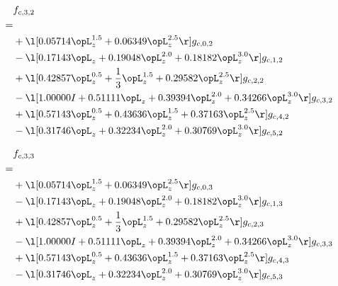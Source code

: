 \begin{alignat}{2} 
\label{eq:f_32_0} 
& f_{c,3,2} \nonumber \\ 
 = \\ 
& + \l[  0.05714 \opL_z^{1.5} +  0.06349 \opL_z^{2.5}  \r] g_{c,0,2} \nonumber \\ 
& - \l[  0.17143 \opL_z +  0.19048 \opL_z^{2.0} +  0.18182 \opL_z^{3.0}  \r] g_{c,1,2} \nonumber \\ 
& + \l[  0.42857 \opL_z^{0.5} + \frac{1}{3} \opL_z^{1.5} +  0.29582 \opL_z^{2.5}  \r] g_{c,2,2} \nonumber \\ 
& - \l[  1.00000 I +  0.51111 \opL_z +  0.39394 \opL_z^{2.0} +  0.34266 \opL_z^{3.0}  \r] g_{c,3,2} \nonumber \\ 
& + \l[  0.57143 \opL_z^{0.5} +  0.43636 \opL_z^{1.5} +  0.37163 \opL_z^{2.5}  \r] g_{c,4,2} \nonumber \\ 
& - \l[  0.31746 \opL_z +  0.32234 \opL_z^{2.0} +  0.30769 \opL_z^{3.0}  \r] g_{c,5,2} \nonumber \\ 
\end{alignat} 


\begin{alignat}{2} 
\label{eq:f_33_0} 
& f_{c,3,3} \nonumber \\ 
 = \\ 
& + \l[  0.05714 \opL_z^{1.5} +  0.06349 \opL_z^{2.5}  \r] g_{c,0,3} \nonumber \\ 
& - \l[  0.17143 \opL_z +  0.19048 \opL_z^{2.0} +  0.18182 \opL_z^{3.0}  \r] g_{c,1,3} \nonumber \\ 
& + \l[  0.42857 \opL_z^{0.5} + \frac{1}{3} \opL_z^{1.5} +  0.29582 \opL_z^{2.5}  \r] g_{c,2,3} \nonumber \\ 
& - \l[  1.00000 I +  0.51111 \opL_z +  0.39394 \opL_z^{2.0} +  0.34266 \opL_z^{3.0}  \r] g_{c,3,3} \nonumber \\ 
& + \l[  0.57143 \opL_z^{0.5} +  0.43636 \opL_z^{1.5} +  0.37163 \opL_z^{2.5}  \r] g_{c,4,3} \nonumber \\ 
& - \l[  0.31746 \opL_z +  0.32234 \opL_z^{2.0} +  0.30769 \opL_z^{3.0}  \r] g_{c,5,3} \nonumber \\ 
\end{alignat} 


